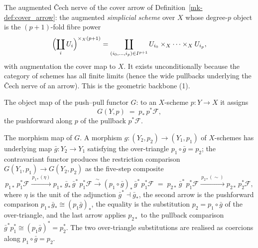 \begin{definition}
  \label{mk-def:cover_cech_nerve}

  The augmented {\v C}ech nerve of the cover arrow of
  Definition~\ref{mk-def:cover_arrow}: the augmented \emph{simplicial scheme} over
  \(X\) whose degree-\(p\) object is the \((p+1)\)-fold fibre power
  \[
    \Bigl(\coprod_{i} U_i\Bigr)^{\times_X (p+1)}
      = \coprod_{(i_0, \ldots, i_p) \in I^{p+1}}
        U_{i_0} \times_X \cdots \times_X U_{i_p},
  \]
  with augmentation the cover map to \(X\). It exists unconditionally because the
  category of schemes has all finite limits (hence the wide pullbacks underlying the
  {\v C}ech nerve of an arrow). This is the geometric backbone (1).
\end{definition}

\begin{definition}\label{mk-def:push_pull_obj}
  \leanok

  The object map of the push--pull functor \(G\): to an \(X\)-scheme
  \(p : Y \to X\) it assigns
  \[
    G(Y, p) \;=\; p_*\, p^*\mathcal{F},
  \]
  the pushforward along \(p\) of the pullback \(p^*\mathcal{F}\).
\end{definition}

\begin{definition}
  \label{mk-def:push_pull_map}

  The morphism map of \(G\). A morphism \(g : (Y_2, p_2) \to (Y_1, p_1)\) of
  \(X\)-schemes has underlying map \(\bar g : Y_2 \to Y_1\) satisfying the
  over-triangle \(p_1 \circ \bar g = p_2\); the contravariant functor produces the
  restriction comparison \(G(Y_1, p_1) \to G(Y_2, p_2)\) as the five-step composite
  \[
    p_{1*}\,p_1^*\mathcal{F}
      \xrightarrow{\,p_{1*}(\eta)\,}
    p_{1*}\,\bar g_*\,\bar g^*\,p_1^*\mathcal{F}
      \xrightarrow{\,\sim\,}
    (p_1 \circ \bar g)_*\,\bar g^*\,p_1^*\mathcal{F}
      \;=\;
    p_{2*}\,\bar g^*\,p_1^*\mathcal{F}
      \xrightarrow{\,p_{2*}(\sim)\,}
    p_{2*}\,p_2^*\mathcal{F},
  \]
  where \(\eta\) is the unit of the adjunction \(\bar g^* \dashv \bar g_*\), the
  second arrow is the pushforward comparison \(p_{1*}\bar g_* \cong (p_1 \bar g)_*\),
  the equality is the substitution \(p_2 = p_1 \circ \bar g\) of the over-triangle,
  and the last arrow applies \(p_{2*}\) to the pullback comparison
  \(\bar g^* p_1^* \cong (p_1 \bar g)^* = p_2^*\). The two over-triangle
  substitutions are realised as coercions along \(p_1 \circ \bar g = p_2\).
\end{definition}

